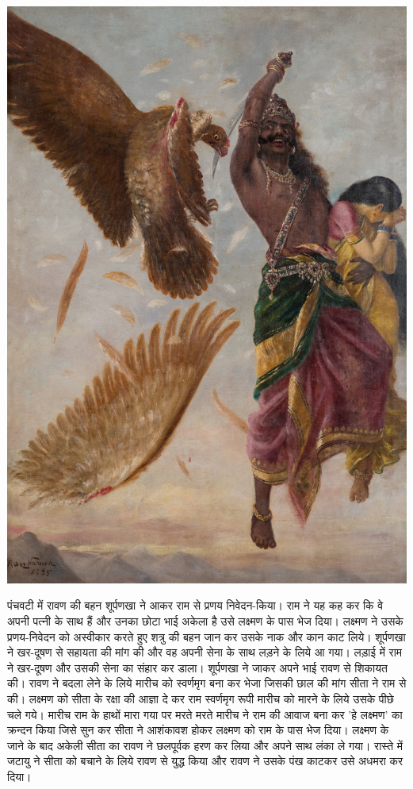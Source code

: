 \documentclass[makeidx, 10pt, oneside, onecolumn, openright, final, svgnames, dvipsnames, extrafontsizes]{memoir}
\begin{document}
 \begin{center}
\includegraphics[scale=0.05]{Ravi_Varma-Ravana_Sita_Jathayu.jpg}
\end{center}

पंचवटी में रावण की बहन शूर्पणखा ने आकर राम से प्रणय निवेदन-किया। राम ने यह कह कर कि वे अपनी पत्नी के साथ हैं और उनका छोटा भाई अकेला है उसे लक्ष्मण के पास भेज दिया। लक्ष्मण ने उसके प्रणय-निवेदन को अस्वीकार करते हुए शत्रु की बहन जान कर उसके नाक और कान काट लिये। शूर्पणखा ने खर-दूषण से सहायता की मांग की और वह अपनी सेना के साथ लड़ने के लिये आ गया। लड़ाई में राम ने खर-दूषण और उसकी सेना का संहार कर डाला। शूर्पणखा ने जाकर अपने भाई रावण से शिकायत की। रावण ने बदला लेने के लिये मारीच को स्वर्णमृग बना कर भेजा जिसकी छाल की मांग सीता ने राम से की। लक्ष्मण को सीता के रक्षा की आज्ञा दे कर राम स्वर्णमृग रूपी मारीच को मारने के लिये उसके पीछे चले गये। मारीच राम के हाथों मारा गया पर मरते मरते मारीच ने राम की आवाज बना कर 'हे लक्ष्मण' का क्रन्दन किया जिसे सुन कर सीता ने आशंकावश होकर लक्ष्मण को राम के पास भेज दिया। लक्ष्मण के जाने के बाद अकेली सीता का रावण ने छलपूर्वक हरण कर लिया और अपने साथ लंका ले गया। रास्ते में जटायु ने सीता को बचाने के लिये रावण से युद्ध किया और रावण ने उसके पंख काटकर उसे अधमरा कर दिया।
\end{document}
